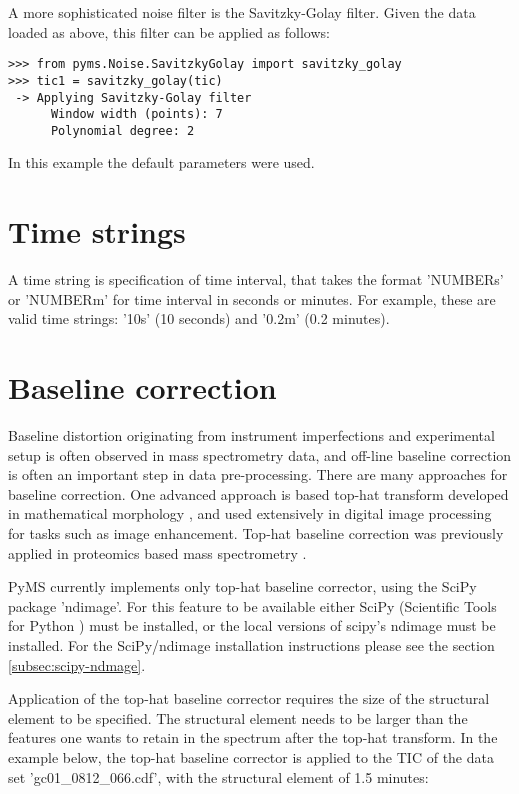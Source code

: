 
A more sophisticated noise filter is the Savitzky-Golay filter.
Given the data loaded as above, this filter can be applied as
follows:

\begin{verbatim}
>>> from pyms.Noise.SavitzkyGolay import savitzky_golay
>>> tic1 = savitzky_golay(tic)
 -> Applying Savitzky-Golay filter
      Window width (points): 7
      Polynomial degree: 2
\end{verbatim}

In this example the default parameters were used.

\section{Time strings}
\label{sec:time-string}

A time string is specification of time interval, that takes the format
'NUMBERs' or 'NUMBERm' for time interval in seconds or minutes. For
example, these are valid time strings: '10s' (10 seconds) and '0.2m'
(0.2 minutes).

\section{Baseline correction}


Baseline distortion originating from instrument imperfections and
experimental setup is often observed in mass spectrometry data,
and off-line baseline correction is often an important step in
data pre-processing. There are many approaches for baseline
correction. One advanced approach is based top-hat transform
developed in mathematical morphology \cite{serra83}, and used
extensively in digital image processing for tasks such as image
enhancement. Top-hat baseline correction was previously applied
in proteomics based mass spectrometry \cite{sauve04}.

PyMS currently implements only top-hat baseline corrector, using
the SciPy package 'ndimage'. For this feature to be available either
SciPy (Scientific Tools for Python \cite{scipy}) must be installed,
or the local versions of scipy's ndimage must be installed. For
the SciPy/ndimage installation instructions please see the section
\ref{subsec:scipy-ndmage}.

Application of the top-hat baseline corrector requires the size
of the structural element to be specified. The structural element
needs to be larger than the features one wants to retain in the
spectrum after the top-hat transform. In the example below, the
top-hat baseline corrector is applied to the TIC of the data set
'gc01\_0812\_066.cdf', with the structural element of 1.5 minutes:

